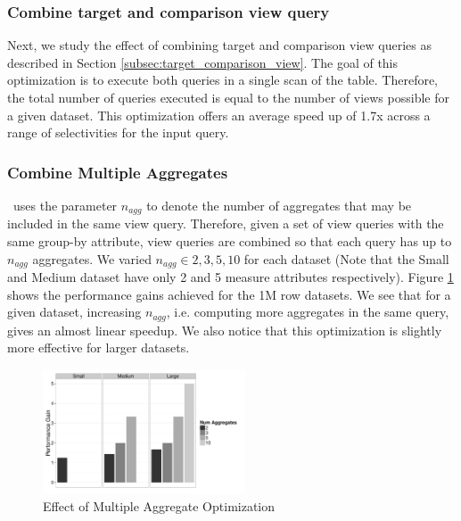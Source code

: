 \subsubsection{Combine target and comparison view query}
Next, we study the effect of combining target and comparison view queries as
described in Section \ref{subsec:target_comparison_view}. The goal of this
optimization is to execute both queries in a single scan of the table.
Therefore, the total number of queries executed is equal to the number of
views possible for a given dataset. This optimization offers an average speed up
of 1.7x across a range of selectivities for the input query.

\subsubsection{Combine Multiple Aggregates}
\VizRecDB\ uses the parameter $n_{agg}$ to denote the number of aggregates that may
be included in the same view query. Therefore, given a set of view queries with
the same group-by attribute, view queries are combined so that each query has up
to $n_{agg}$ aggregates. We varied $n_{agg} \in {2, 3, 5, 10}$ for each dataset
(Note that the Small and Medium dataset have only 2 and 5 measure attributes
respectively).
Figure \ref{fig:mult_agg} shows the performance gains achieved for the 1M row
datasets. We see that for a given dataset, increasing $n_{agg}$, i.e. computing
more aggregates in the same query, gives an almost linear speedup. We also
notice that this optimization is slightly more effective for larger datasets.

\begin{figure}[h]

  \centering
    \includegraphics[width=6cm]{Images/mult_agg.pdf}
    \caption{Effect of Multiple Aggregate Optimization} 
      \label{fig:mult_agg}
\end{figure}

